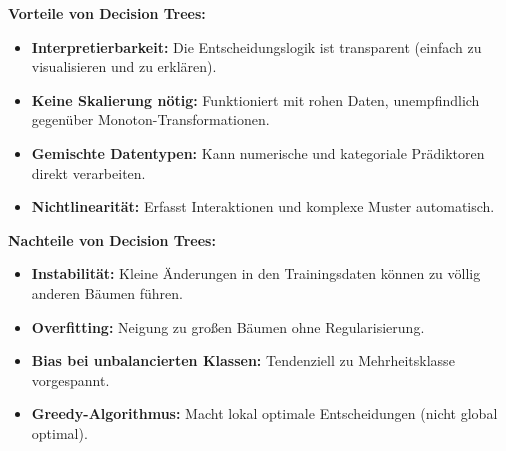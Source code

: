 
\textbf{Vorteile von Decision Trees:}
\begin{itemize}[leftmargin=1.5em]
    \item \textbf{Interpretierbarkeit:} Die Entscheidungslogik ist transparent (einfach zu visualisieren und zu erklären).
    \item \textbf{Keine Skalierung nötig:} Funktioniert mit rohen Daten, unempfindlich gegenüber Monoton-Transformationen.
    \item \textbf{Gemischte Datentypen:} Kann numerische und kategoriale Prädiktoren direkt verarbeiten.
    \item \textbf{Nichtlinearität:} Erfasst Interaktionen und komplexe Muster automatisch.
\end{itemize}

\textbf{Nachteile von Decision Trees:}
\begin{itemize}[leftmargin=1.5em]
    \item \textbf{Instabilität:} Kleine Änderungen in den Trainingsdaten können zu völlig anderen Bäumen führen.
    \item \textbf{Overfitting:} Neigung zu großen Bäumen ohne Regularisierung.
    \item \textbf{Bias bei unbalancierten Klassen:} Tendenziell zu Mehrheitsklasse vorgespannt.
    \item \textbf{Greedy-Algorithmus:} Macht lokal optimale Entscheidungen (nicht global optimal).
\end{itemize}

